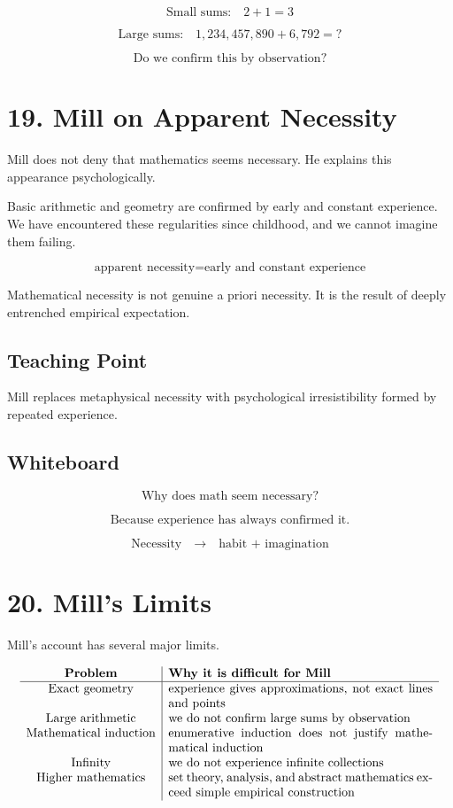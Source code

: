 \documentclass[11pt]{article}
\begin{document}
\[
\text{Small sums:}
\quad
2+1=3
\]

\[
\text{Large sums:}
\quad
1{,}234{,}457{,}890 + 6{,}792 = ?
\]

\[
\text{Do we confirm this by observation?}
\]

\section*{19. Mill on Apparent Necessity}

Mill does not deny that mathematics seems necessary. He explains this appearance
psychologically.

Basic arithmetic and geometry are confirmed by early and constant experience. We have
encountered these regularities since childhood, and we cannot imagine them failing.

\[
\text{apparent necessity}
=
\text{early and constant experience}
\]

Mathematical necessity is not genuine a priori necessity. It is the result of deeply
entrenched empirical expectation.

\subsection*{Teaching Point}

Mill replaces metaphysical necessity with psychological irresistibility formed by repeated
experience.

\subsection*{Whiteboard}

\[
\text{Why does math seem necessary?}
\]

\[
\text{Because experience has always confirmed it.}
\]

\[
\text{Necessity}
\quad \rightarrow \quad
\text{habit + imagination}
\]

\section*{20. Mill's Limits}

Mill's account has several major limits.

\[
\begin{array}{c|p{0.62\textwidth}}
\textbf{Problem} & \textbf{Why it is difficult for Mill} \\
\hline
\text{Exact geometry} &
experience gives approximations, not exact lines and points \\

\text{Large arithmetic} &
we do not confirm large sums by observation \\

\text{Mathematical induction} &
enumerative induction does not justify mathematical induction \\

\text{Infinity} &
we do not experience infinite collections \\

\text{Higher mathematics} &
set theory, analysis, and abstract mathematics exceed simple empirical construction
\end{array}
\]
\end{document}
